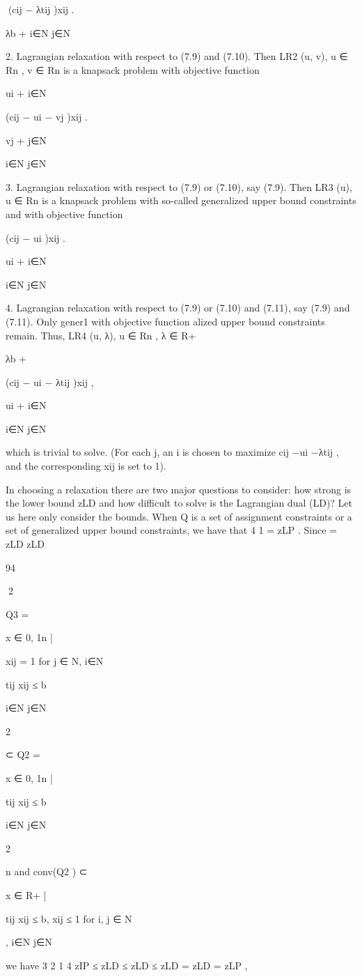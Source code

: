 \documentclass[titlepage]{book}
\theoremstyle{plain}
\theoremstyle{definition}
\theoremstyle{remark}
\begin{document}
(cij − λtij )xij .

λb +
i∈N j∈N

2. Lagrangian relaxation with respect to (7.9) and (7.10). Then LR2 (u, v), u ∈ Rn , v ∈ Rn is a
knapsack problem with objective function

ui +
i∈N

(cij − ui − vj )xij .

vj +
j∈N

i∈N j∈N

3. Lagrangian relaxation with respect to (7.9) or (7.10), say (7.9). Then LR3 (u), u ∈ Rn is a knapsack
problem with so-called generalized upper bound constraints and with objective function

(cij − ui )xij .

ui +
i∈N

i∈N j∈N

4. Lagrangian relaxation with respect to (7.9) or (7.10) and (7.11), say (7.9) and (7.11). Only gener1
with objective function
alized upper bound constraints remain. Thus, LR4 (u, λ), u ∈ Rn , λ ∈ R+

λb +

(cij − ui − λtij )xij ,

ui +
i∈N

i∈N j∈N

which is trivial to solve. (For each j, an i is chosen to maximize cij −ui −λtij , and the corresponding
xij is set to 1).

In choosing a relaxation there are two major questions to consider: how strong is the lower bound zLD
and how difficult to solve is the Lagrangian dual (LD)? Let us here only consider the bounds.
When Q is a set of assignment constraints or a set of generalized upper bound constraints, we have that
4
1
= zLP . Since
= zLD
zLD

94

2

Q3 = {x ∈ {0, 1}n |

xij = 1 for j ∈ N,
i∈N

tij xij ≤ b}
i∈N j∈N

2

⊂ Q2 = {x ∈ {0, 1}n |

tij xij ≤ b}
i∈N j∈N

2

n
and conv(Q2 ) ⊂ {x ∈ R+
|

tij xij ≤ b, xij ≤ 1 for i, j ∈ N },
i∈N j∈N

we have
3
2
1
4
zIP ≤ zLD
≤ zLD
≤ zLD
= zLD
= zLP ,
\end{document}
